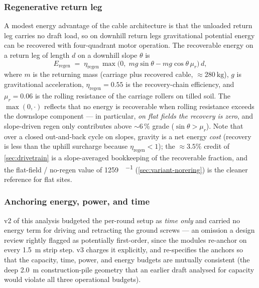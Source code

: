 \documentclass[11pt,a4paper]{article}
\begin{document}
\subsubsection{Regenerative return leg}\label{sec:regen}

A modest energy advantage of the cable architecture is that the unloaded return leg carries no draft load, so on downhill return legs gravitational potential energy can be recovered with four-quadrant motor operation. The recoverable energy on a return leg of length $d$ on a downhill slope $\theta$ is
\begin{equation}\label{eq:regen}
E_{\text{regen}} \;=\; \eta_{\text{regen}}\,\max\!\bigl(0,\; m g \sin\theta - m g \cos\theta\,\mu_r\bigr)\, d,
\end{equation}
where $m$ is the returning mass (carriage plus recovered cable, ${\approx}\SI{280}{\kilogram}$), $g$ is gravitational acceleration, $\eta_{\text{regen}} = 0.55$ is the recovery-chain efficiency, and $\mu_r = 0.06$ is the rolling resistance of the carriage rollers on tilled soil. The $\max(0,\cdot)$ reflects that no energy is recoverable when rolling resistance exceeds the downslope component --- in particular, \emph{on flat fields the recovery is zero}, and slope-driven regen only contributes above ${\sim}6\,\%$ grade ($\sin\theta > \mu_r$). Note that over a closed out-and-back cycle on slopes, gravity is a net energy \emph{cost} (recovery is less than the uphill surcharge because $\eta_{\text{regen}}<1$); the ${\approx}3.5\%$ credit of \cref{sec:drivetrain} is a slope-averaged bookkeeping of the recoverable fraction, and the flat-field / no-regen value of \SI{1259}{\Wh\per\decare} (\cref{sec:variant-norering}) is the cleaner reference for flat sites.

\subsubsection{Anchoring energy, power, and time}\label{sec:anchoring-energy}

v2 of this analysis budgeted the per-round setup as \emph{time only} and carried no energy term for driving and retracting the ground screws --- an omission a design review rightly flagged as potentially first-order, since the modules re-anchor on every \SI{1.5}{\meter} strip step. v3 charges it explicitly, and re-specifies the anchors so that the capacity, time, power, and energy budgets are mutually consistent (the deep \SI{2.0}{\meter} construction-pile geometry that an earlier draft analysed for capacity would violate all three operational budgets).
\end{document}
